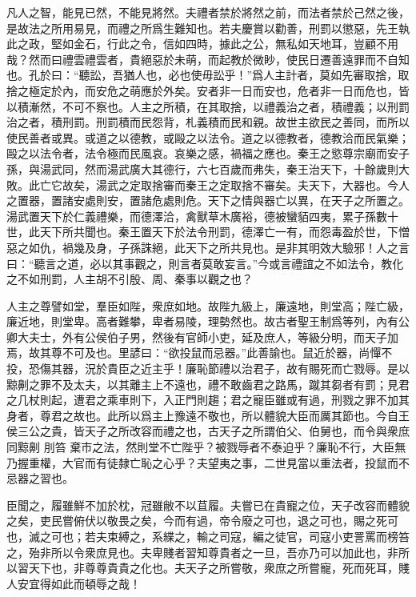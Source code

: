 \documentclass[12pt,a4paper]{ctexbook}
\begin{document}
凡人之智，能見已然，不能見將然。夫禮者禁於將然之前，而法者禁於己然之後，是故法之所用易見，而禮之所爲生難知也。若夫慶賞以勸善，刑罰以懲惡，先王執此之政，堅如金石，行此之令，信如四時，據此之公，無私如天地耳，豈顧不用哉？然而曰禮雲禮雲者，貴絕惡於未萌，而起教於微眇，使民日遷善遠罪而不自知也。孔於曰：“聽訟，吾猶人也，必也使毋訟乎！”爲人主計者，莫如先審取捨，取捨之極定於內，而安危之萌應於外矣。安者非一日而安也，危者非一日而危也，皆以積漸然，不可不察也。人主之所積，在其取捨，以禮義治之者，積禮義；以刑罰治之者，積刑罰。刑罰積而民怨背，札義積而民和親。故世主欲民之善同，而所以使民善者或異。或道之以德教，或毆之以法令。道之以德教者，德教洽而民氣樂；毆之以法令者，法令極而民風哀。哀樂之感，禍福之應也。秦王之慾尊宗廟而安子孫，與湯武同，然而湯武廣大其德行，六七百歲而弗失，秦王治天下，十餘歲則大敗。此亡它故矣，湯武之定取捨審而秦王之定取捨不審矣。夫天下，大器也。今人之置器，置諸安處則安，置諸危處則危。天下之情與器亡以異，在天子之所置之。湯武置天下於仁義禮樂，而德澤洽，禽獸草木廣裕，德被蠻貊四夷，累子孫數十世，此天下所共聞也。秦王置天下於法令刑罰，德澤亡一有，而怨毒盈於世，下憎惡之如仇，禍幾及身，子孫誅絕，此天下之所共見也。是非其明效大驗邪！人之言曰：“聽言之道，必以其事觀之，則言者莫敢妄言。”今或言禮誼之不如法令，教化之不如刑罰，人主胡不引殷、周、秦事以觀之也？\par
人主之尊譬如堂，羣臣如陛，衆庶如地。故陛九級上，廉遠地，則堂高；陛亡級，廉近地，則堂卑。高者難攀，卑者易陵，理勢然也。故古者聖王制爲等列，內有公卿大夫士，外有公侯伯子男，然後有官師小吏，延及庶人，等級分明，而天子加焉，故其尊不可及也。里諺曰：“欲投鼠而忌器。”此善諭也。鼠近於器，尚憚不投，恐傷其器，況於貴臣之近主乎！廉恥節禮以治君子，故有賜死而亡戮辱。是以黥劓之罪不及太夫，以其離主上不遠也，禮不敢齒君之路馬，蹴其芻者有罰；見君之几杖則起，遭君之乘車則下，入正門則趨；君之寵臣雖或有過，刑戮之罪不加其身者，尊君之故也。此所以爲主上豫遠不敬也，所以體貌大臣而厲其節也。今自王侯三公之貴，皆天子之所改容而禮之也，古天子之所謂伯父、伯舅也，而令與衆庶同黥劓 刖笞 棄市之法，然則堂不亡陛乎？被戮辱者不泰迫乎？廉恥不行，大臣無乃握重權，大官而有徒隸亡恥之心乎？夫望夷之事，二世見當以重法者，投鼠而不忌器之習也。\par
臣聞之，履雖鮮不加於枕，冠雖敝不以苴履。夫嘗已在貴寵之位，天子改容而體貌之矣，吏民嘗俯伏以敬畏之矣，今而有過，帝令廢之可也，退之可也，賜之死可也，滅之可也；若夫束縛之，系緤之，輸之司寇，編之徒官，司寇小吏詈罵而榜笞之，殆非所以令衆庶見也。夫卑賤者習知尊貴者之一旦，吾亦乃可以加此也，非所以習天下也，非尊尊貴貴之化也。夫天子之所嘗敬，衆庶之所嘗寵，死而死耳，賤人安宜得如此而頓辱之哉！\par
\end{document}
